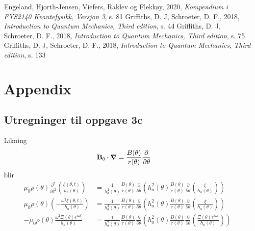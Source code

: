 \documentclass[reprint, english,notitlepage]{revtex4-1}  %
\begin{document}
\onecolumngrid
\vspace{1cm} %
\newpage

\begin{thebibliography}{}
 Engeland, Hjorth-Jensen, Viefers, Raklev og Flekkøy,  2020, \textit{Kompendium i FYS2140 Kvantefysikk, Versjon 3}, s. 81
 Griffiths, D. J, Schroeter, D. F.,  2018, \textit{Introduction to Quantum Mechanics, Third edition}, s. 44
 Griffiths, D. J, Schroeter, D. F.,  2018, \textit{Introduction to Quantum Mechanics, Third edition}, s. 75
 Griffiths, D. J, Schroeter, D. F.,  2018, \textit{Introduction to Quantum Mechanics, Third edition}, s. 133

\end{thebibliography}

\section{Appendix}

\subsection{Utregninger til oppgave 3c}

Likning
\begin{align*}
  \textbf B_0 \cdot \boldsymbol \nabla &= \frac{B(\theta)}{r(\theta)} \frac{\partial}{\partial \theta}
\end{align*}
blir
\begin{align*}
  \mu_0 \rho(\theta) \frac{\partial^2}{\partial t^2} \left( \frac{\xi(\theta, t)}{h_a(\theta)} \right) &= \frac{1}{h_a^2(\theta)} \frac{B(\theta)}{r(\theta)} \frac{\partial}{\partial \theta} \left( h_a^2(\theta) \frac{B(\theta)}{r(\theta)} \frac{\partial}{\partial \theta} \left( \frac{\xi}{h_a(\theta)} \right) \right) \\
  \mu_0 \rho(\theta) \left( - \frac{\omega^2 \xi(\theta, t)}{h_a(\theta)} \right) &= \frac{1}{h_a^2(\theta)} \frac{B(\theta)}{r(\theta)} \frac{\partial}{\partial \theta} \left( h_a^2(\theta) \frac{B(\theta)}{r(\theta)} \frac{\partial}{\partial \theta} \left( \frac{\xi}{h_a(\theta)} \right) \right) \\
  - \mu_0 \rho(\theta) \frac{\omega^2 \Xi(\theta) e^{i \omega t}}{h_a(\theta)} &= \frac{1}{h_a^2(\theta)} \frac{B(\theta)}{r(\theta)} \frac{\partial}{\partial \theta} \left( h_a^2(\theta) \frac{B(\theta)}{r(\theta)} \frac{\partial}{\partial \theta} \left( \frac{\Xi(\theta) e^{i \omega t}}{h_a(\theta)} \right) \right)
\end{align*}
\end{document}
